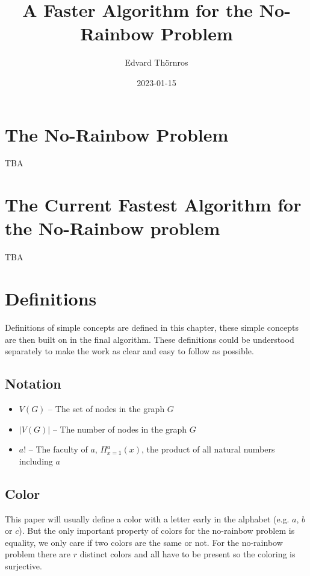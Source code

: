 \documentclass{book}
\title{A Faster Algorithm for the No-Rainbow Problem}
\author{Edvard Thörnros}
\date{2023-01-15}
\begin{document}
\maketitle

\tableofcontents




\chapter{The No-Rainbow Problem}
TBA

\chapter{The Current Fastest Algorithm for the No-Rainbow problem}
TBA

\chapter{Definitions}
Definitions of simple concepts are defined in this chapter, these simple concepts are then built on in the final algorithm. These definitions could be understood separately to make the work as clear and easy to follow as possible.

\section{Notation}
\begin{itemize}
  \item $V(G)$ -- The set of nodes in the graph $G$ 
  \item $|V(G)|$ -- The number of nodes in the graph $G$ 
  \item $a!$ -- The faculty of $a$, $\Pi_{x=1}^a(x)$, the product of all natural numbers including $a$
\end{itemize}

\section{Color}
This paper will usually define a color with a letter early in the alphabet (e.g. $a$, $b$ or $c$). But the only important property of colors for the no-rainbow problem is equality, we only care if two colors are the same or not. For the no-rainbow problem there are $r$ distinct colors and all have to be present so the coloring is surjective.
\end{document}

